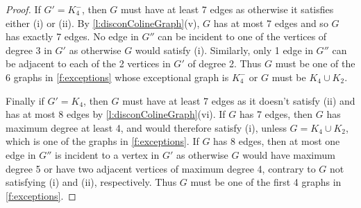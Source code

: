 \documentclass[12pt]{article}
\theoremstyle{definition}
\begin{document}
\begin{proof}
If $G' = K_4^-$, then $G$ must have at least 7 edges as otherwise it satisfies either (i) or (ii). By \cref{l:disconColineGraph}(v), $G$ has at most 7 edges and so $G$ has exactly 7 edges. No edge in $G''$ can be incident to one of the vertices of degree 3 in $G'$ as otherwise $G$ would satisfy (i). %
Similarly, only 1 edge in $G''$ can be adjacent to each of the 2 vertices in $G'$ of degree 2. Thus $G$ must be one of the 6 graphs in \cref{f:exceptions} whose exceptional graph is $K_4^-$ or $G$ must be $K_4\cup K_2$.

Finally if $G'=K_4$, then $G$ must have at least 7 edges as it doesn't satisfy (ii) and has at most 8 edges by \cref{l:disconColineGraph}(vi). If $G$ has 7 edges, then $G$ has maximum degree at least 4, and would therefore satisfy (i), unless $G = K_4\cup K_2$, which is one of the graphs in \cref{f:exceptions}. If $G$ has 8 edges, then at most one edge in $G''$ is incident to a vertex in $G'$ as otherwise $G$ would have maximum degree 5 or have two adjacent vertices of maximum degree 4, contrary to $G$ not satisfying (i) and (ii), respectively. Thus $G$ must be one of the first 4 graphs in \cref{f:exceptions}.

\end{proof}
\end{document}
